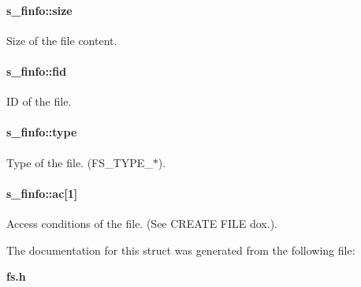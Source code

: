 \paragraph{ {\bf s\_\-finfo::size}}\hfill\label{structs__finfo_e59b244a2c42920a988419568a0d4ab5}


Size of the file content. 

\paragraph{ {\bf s\_\-finfo::fid}}\hfill\label{structs__finfo_864b248ae358e708aec64b7d7ddc35f3}


ID of the file. 

\paragraph{ {\bf s\_\-finfo::type}}\hfill\label{structs__finfo_41bbc495939ea65ac01a8e210bf9a47c}


Type of the file. (FS\_\-TYPE\_\-$\ast$). 

\paragraph{ {\bf s\_\-finfo::ac}[1]}\hfill\label{structs__finfo_1f5a3947c58b7f6f5be099bf2e84b1aa}


Access conditions of the file. (See CREATE FILE dox.). 



The documentation for this struct was generated from the following file:\begin{CompactItemize}
\item 
{\bf fs.h}\end{CompactItemize}
